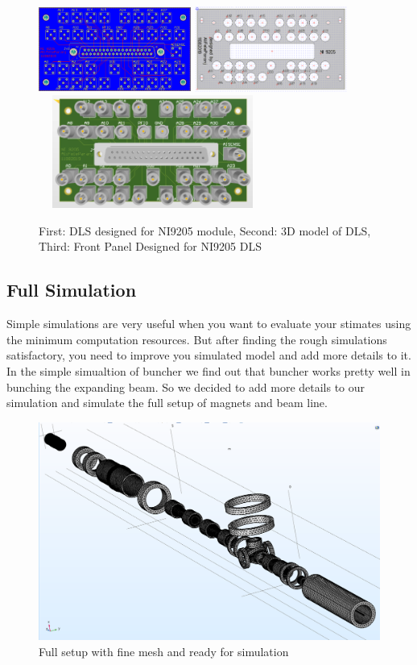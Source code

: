 \documentclass[12pt,a4paper]{article}
\begin{document}
\begin{figure}[h]
\centering
\includegraphics[width=50mm, height=28mm]{ni9205_pcb}
\includegraphics[width=50mm,
height=28mm]{ni9205panel}
\includegraphics[width=75mm,
height=37mm]{ni9205_3d}
\caption{First: DLS designed for NI9205 module, Second: 3D model of DLS, Third: Front Panel Designed for NI9205 DLS}
\label{NI}
\end{figure}


\subsection{Full Simulation}
‌Simple simulations are very useful when you want to evaluate your stimates using the minimum computation resources. But after finding the rough simulations satisfactory, you need to improve you simulated model and add more details to it. In the simple simualtion of buncher we find out that buncher works pretty well in bunching the expanding beam. So we decided to add more details to our simulation and simulate the full setup of magnets and beam line.

\begin{figure}[h]
\centering
\includegraphics[scale=0.4]{full-mesh}
\caption{Full setup with fine mesh and ready for simulation}
\end{figure}
\end{document}
